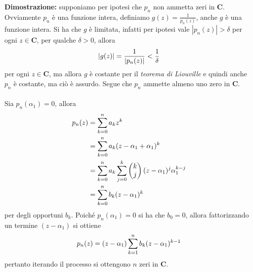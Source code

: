 \documentclass{article}
\begin{document}
\textbf{Dimostrazione:} supponiamo per ipotesi che $p_n$ non ammetta zeri in $\mathbf{C}$. Ovviamente $p_n$ è una funzione intera, definiamo $g(z) = \frac{1}{p_n(z)}$, anche $g$ è una funzione intera. Si ha che $g$ è limitata, infatti per ipotesi vale $|p_n(z)| > \delta$ per ogni $z \in \mathbf{C}$, per qualche $\delta > 0$, allora
\begin{gather}
    |g(z)| = \frac{1}{|p_n(z)|} < \frac{1}{\delta} \notag
\end{gather}
per ogni $z \in \mathbf{C}$, ma allora $g$ è costante per il \textit{teorema di Liouville} e quindi anche $p_n$ è costante, ma ciò è assurdo. Segue che $p_n$ ammette almeno uno zero in $\mathbf{C}$. \\ \\
Sia $p_n(\alpha_1) = 0$, allora
\begin{align}
    p_n(z) &= \sum_{k = 0}^n a_kz^k \notag \\
    &= \sum_{k = 0}^na_k(z - \alpha_1 + \alpha_1)^k \notag \\
    &= \sum_{k = 0}^na_k\sum_{j = 0}^k \begin{pmatrix}
        k \\
        j
    \end{pmatrix}(z - \alpha_1)^j\alpha_1^{k - j} \notag \\
    &= \sum_{k = 0}^nb_k(z - \alpha_1)^k \notag
\end{align}
per degli opportuni $b_k$. Poiché $p_n(\alpha_1) = 0$ si ha che $b_0 = 0$, allora fattorizzando un termine $(z - \alpha_1)$ si ottiene
\begin{gather}
    p_n(z) = (z - \alpha_1)\sum_{k = 1}^{n}b_k(z - \alpha_1)^{k - 1} \notag
\end{gather}
pertanto iterando il processo si ottengono $n$ zeri in $\mathbf{C}$.

\newpage
\end{document}
